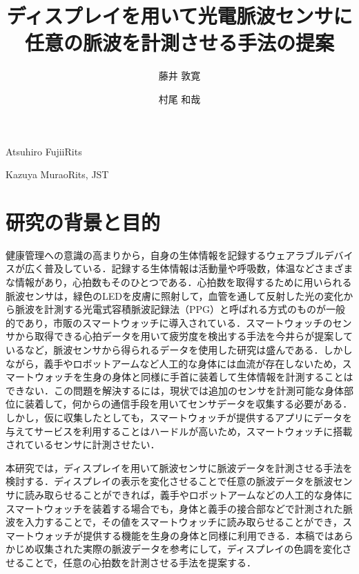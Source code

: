 \documentclass[Japanese,noauthor]{dicomopapers}
\begin{document}
\title{ディスプレイを用いて光電脈波センサに任意の脈波を計測させる手法の提案}



\author{藤井 敦寛}{Atsuhiro Fujii}{Rits}
\author{村尾 和哉}{Kazuya Murao}{Rits, JST}

\maketitle

\section{研究の背景と目的}
健康管理への意識の高まりから，自身の生体情報を記録するウェアラブルデバイスが広く普及している．記録する生体情報は活動量や呼吸数，体温などさまざまな情報があり，心拍数もそのひとつである．心拍数を取得するために用いられる脈波センサは，緑色のLEDを皮膚に照射して，血管を通して反射した光の変化から脈波を計測する光電式容積脈波記録法（PPG）と呼ばれる方式のものが一般的であり，市販のスマートウォッチに導入されている．スマートウォッチのセンサから取得できる心拍データを用いて疲労度を検出する手法を今井ら\cite{fatigue_detection}が提案しているなど，脈波センサから得られるデータを使用した研究は盛んである．しかしながら，義手やロボットアームなど人工的な身体には血流が存在しないため，スマートウォッチを生身の身体と同様に手首に装着して生体情報を計測することはできない．この問題を解決するには，現状では追加のセンサを計測可能な身体部位に装着して，何からの通信手段を用いてセンサデータを収集する必要がある．しかし，仮に収集したとしても，スマートウォッチが提供するアプリにデータを与えてサービスを利用することはハードルが高いため，スマートウォッチに搭載されているセンサに計測させたい．
\par

本研究では，ディスプレイを用いて脈波センサに脈波データを計測させる手法を検討する．ディスプレイの表示を変化させることで任意の脈波データを脈波センサに読み取らせることができれば，義手やロボットアームなどの人工的な身体にスマートウォッチを装着する場合でも，身体と義手の接合部などで計測された脈波を入力することで，その値をスマートウォッチに読み取らせることができ，スマートウォッチが提供する機能を生身の身体と同様に利用できる．本稿ではあらかじめ収集された実際の脈波データを参考にして，ディスプレイの色調を変化させることで，任意の心拍数を計測させる手法を提案する．
\end{document}

